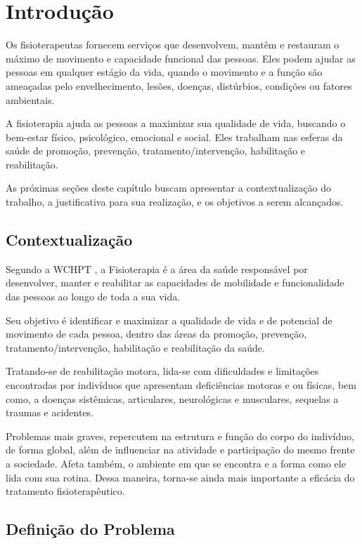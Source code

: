 \chapter[Introdução]{Introdução}

Os fisioterapeutas fornecem serviços que desenvolvem, mantêm e restauram o máximo
 de movimento e capacidade funcional das pessoas. Eles podem ajudar as pessoas em
  qualquer estágio da vida, quando o movimento e a função são ameaçadas pelo envelhecimento,
   lesões, doenças, distúrbios, condições ou fatores ambientais.

A fisioterapia ajuda as pessoas a maximizar sua qualidade de vida, buscando
o bem-estar físico, psicológico, emocional e social. Eles trabalham nas esferas da
 saúde de promoção, prevenção, tratamento/intervenção, habilitação e reabilitação.\cite{wcpt}

 As próximas seções deste capítulo
buscam apresentar a contextualização do trabalho,
a justificativa para sua realização, e os objetivos a serem alcançados.

\section{Contextualização}
\label{Sec:contextualizacao}
  Segundo a WCHPT \cite{wcpt}, a Fisioterapia é
 a área da saúde responsável por desenvolver, manter e reabilitar as
  capacidades de mobilidade e funcionalidade das pessoas ao longo de toda a sua vida.

  Seu objetivo é identificar e maximizar a qualidade de vida
 e de potencial de movimento de cada pessoa, dentro das áreas da promoção, prevenção,
  tratamento/intervenção, habilitação e reabilitação da saúde.

  Tratando-se de reabilitação motora, lida-se com dificuldades e limitações encontradas por
  indivíduos que apresentam deficiências motoras e ou físicas, bem como,
  a doenças sistêmicas, articulares, neurológicas e musculares, sequelas a
  traumas e acidentes.

  Problemas mais graves, repercutem
  na estrutura e função do corpo do indivíduo, de forma global, além de
  influenciar na atividade e participação do mesmo frente a sociedade. Afeta
  também, o ambiente em que se encontra e a forma como ele lida com sua rotina.
  Dessa maneira, torna-se ainda mais importante a eficácia do tratamento
  fisioterapêutico.



\section{Definição do Problema}
\label{Sec:DefinicaoProblema}

